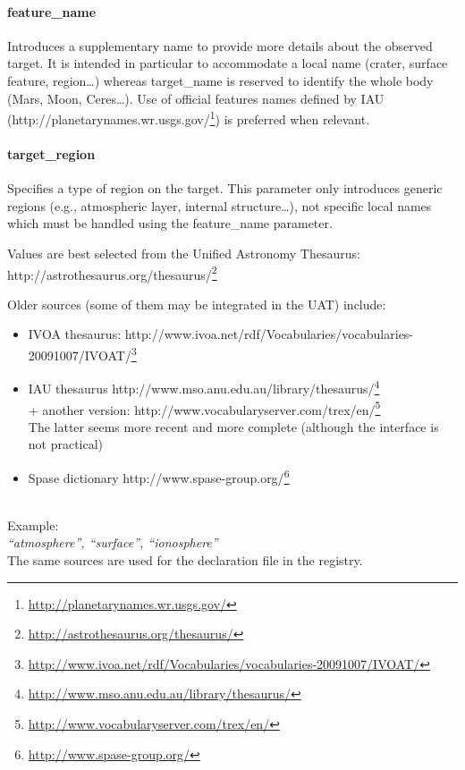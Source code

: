 \documentclass[11pt,a4paper]{ivoa}
\begin{document}
\paragraph{feature\_name}

Introduces a supplementary name to provide more details about the observed target. It is intended in particular to accommodate a local name (crater, surface feature, region…) whereas target\_name is reserved to identify the whole body (Mars, Moon, Ceres…). Use of official features names defined by IAU (http://planetarynames.wr.usgs.gov/\footnote{\url{http://planetarynames.wr.usgs.gov/}}) is preferred when relevant.

\paragraph{target\_region}

Specifies a type of region on the target. This parameter only introduces generic regions  (e.g., atmospheric layer, internal structure…), not specific local names which must be handled using the feature\_name parameter.

Values are best selected from the Unified Astronomy Thesaurus: http://astrothesaurus.org/thesaurus/\footnote{\url{http://astrothesaurus.org/thesaurus/}}

Older sources (some of them may be integrated in the UAT) include:

\begin{itemize}

\item IVOA thesaurus: http://www.ivoa.net/rdf/Vocabularies/vocabularies-20091007/IVOAT/\footnote{\url{http://www.ivoa.net/rdf/Vocabularies/vocabularies-20091007/IVOAT/}}

\item IAU thesaurus http://www.mso.anu.edu.au/library/thesaurus/\footnote{\url{http://www.mso.anu.edu.au/library/thesaurus/}}\\+ another version: http://www.vocabularyserver.com/trex/en/\footnote{\url{http://www.vocabularyserver.com/trex/en/}}\\The latter seems more recent and more complete (although the interface is not practical)

\item Spase dictionary http://www.spase-group.org/\footnote{\url{http://www.spase-group.org/}}

\end{itemize}

\\Example: \\\emph{``atmosphere'', ``surface'', ``ionosphere''}\\The same sources are used for the declaration file in the registry.
\end{document}
